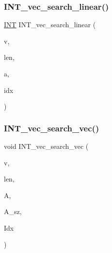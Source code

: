 \subsubsection{\texorpdfstring{I\+N\+T\+\_\+vec\+\_\+search\+\_\+linear()}{INT\_vec\_search\_linear()}}
{\footnotesize\ttfamily \mbox{\hyperlink{galois_8h_a09fddde158a3a20bd2dcadb609de11dc}{I\+NT}} I\+N\+T\+\_\+vec\+\_\+search\+\_\+linear (\begin{DoxyParamCaption}\item[{\mbox{\hyperlink{galois_8h_a09fddde158a3a20bd2dcadb609de11dc}{I\+NT}} $\ast$}]{v,  }\item[{\mbox{\hyperlink{galois_8h_a09fddde158a3a20bd2dcadb609de11dc}{I\+NT}}}]{len,  }\item[{\mbox{\hyperlink{galois_8h_a09fddde158a3a20bd2dcadb609de11dc}{I\+NT}}}]{a,  }\item[{\mbox{\hyperlink{galois_8h_a09fddde158a3a20bd2dcadb609de11dc}{I\+NT}} \&}]{idx }\end{DoxyParamCaption})}

\mbox{\label{sorting_8_c_a5359bd2dbac8e1ab54a374c6ed85f69b}} 
\subsubsection{\texorpdfstring{I\+N\+T\+\_\+vec\+\_\+search\+\_\+vec()}{INT\_vec\_search\_vec()}}
{\footnotesize\ttfamily void I\+N\+T\+\_\+vec\+\_\+search\+\_\+vec (\begin{DoxyParamCaption}\item[{\mbox{\hyperlink{galois_8h_a09fddde158a3a20bd2dcadb609de11dc}{I\+NT}} $\ast$}]{v,  }\item[{\mbox{\hyperlink{galois_8h_a09fddde158a3a20bd2dcadb609de11dc}{I\+NT}}}]{len,  }\item[{\mbox{\hyperlink{galois_8h_a09fddde158a3a20bd2dcadb609de11dc}{I\+NT}} $\ast$}]{A,  }\item[{\mbox{\hyperlink{galois_8h_a09fddde158a3a20bd2dcadb609de11dc}{I\+NT}}}]{A\+\_\+sz,  }\item[{\mbox{\hyperlink{galois_8h_a09fddde158a3a20bd2dcadb609de11dc}{I\+NT}} $\ast$}]{Idx }\end{DoxyParamCaption})}

\mbox{\label{sorting_8_c_a3a52bbb40fb612b47834733329d552df}} 
